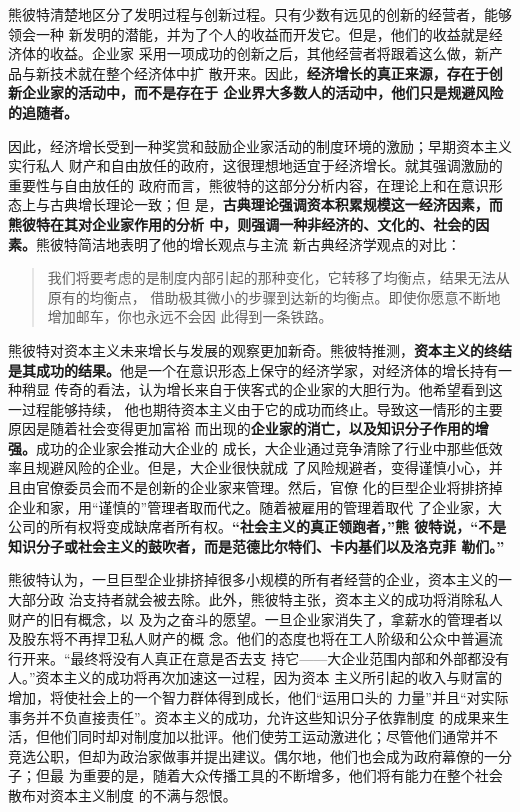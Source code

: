 熊彼特清楚地区分了发明过程与创新过程。只有少数有远见的创新的经营者，能够领会一种
新发明的潜能，并为了个人的收益而开发它。但是，他们的收益就是经济体的收益。企业家
采用一项成功的创新之后，其他经营者将跟着这么做，新产品与新技术就在整个经济体中扩
散开来。因此，\textbf{经济增长的真正来源，存在于创新企业家的活动中，而不是存在于
  企业界大多数人的活动中，他们只是规避风险的追随者。}

因此，经济增长受到一种奖赏和鼓励企业家活动的制度环境的激励；早期资本主义实行私人
财产和自由放任的政府，这很理想地适宜于经济增长。就其强调激励的重要性与自由放任的
政府而言，熊彼特的这部分分析内容，在理论上和在意识形态上与古典增长理论一致；但
是，\textbf{古典理论强调资本积累规模这一经济因素，而熊彼特在其对企业家作用的分析
中，则强调一种非经济的、文化的、社会的因素。}熊彼特简洁地表明了他的增长观点与主流
新古典经济学观点的对比：

\begin{quotation}
  我们将要考虑的是制度内部引起的那种变化，它转移了均衡点，结果无法从原有的均衡点，
  借助极其微小的步骤到达新的均衡点。即使你愿意不断地增加邮车，你也永远不会因
  此得到一条铁路。
\end{quotation}

熊彼特对资本主义未来增长与发展的观察更加新奇。熊彼特推测，\textbf{资本主义的终结
  是其成功的结果。}他是一个在意识形态上保守的经济学家，对经济体的增长持有一种稍显
传奇的看法，认为增长来自于侠客式的企业家的大胆行为。他希望看到这一过程能够持续，
他也期待资本主义由于它的成功而终止。导致这一情形的主要原因是随着社会变得更加富裕
而出现的\textbf{企业家的消亡，以及知识分子作用的增强。}成功的企业家会推动大企业的
成长，大企业通过竞争清除了行业中那些低效率且规避风险的企业。但是，大企业很快就成
了风险规避者，变得谨慎小心，并且由官僚委员会而不是创新的企业家来管理。然后，官僚
化的巨型企业将排挤掉企业和家，用“谨慎的”管理者取而代之。随着被雇用的管理着取代
了企业家，大公司的所有权将变成缺席者所有权。\textbf{“社会主义的真正领跑者，”熊
  彼特说，“不是知识分子或社会主义的鼓吹者，而是范德比尔特们、卡内基们以及洛克菲
  勒们。”}

熊彼特认为，一旦巨型企业排挤掉很多小规模的所有者经营的企业，资本主义的一大部分政
治支持者就会被去除。此外，熊彼特主张，资本主义的成功将消除私人财产的旧有概念，以
及为之奋斗的愿望。一旦企业家消失了，拿薪水的管理者以及股东将不再捍卫私人财产的概
念。他们的态度也将在工人阶级和公众中普遍流行开来。“最终将没有人真正在意是否去支
持它——大企业范围内部和外部都没有人。”资本主义的成功将再次加速这一过程，因为资本
主义所引起的收入与财富的增加，将使社会上的一个智力群体得到成长，他们“运用口头的
力量”并且“对实际事务并不负直接责任”。资本主义的成功，允许这些知识分子依靠制度
的成果来生活，但他们同时却对制度加以批评。他们使劳工运动激进化；尽管他们通常并不
竞选公职，但却为政治家做事并提出建议。偶尔地，他们也会成为政府幕僚的一分子；但最
为重要的是，随着大众传播工具的不断增多，他们将有能力在整个社会散布对资本主义制度
的不满与怨恨。

